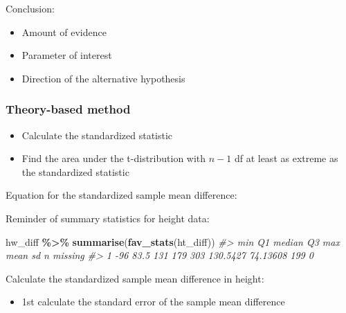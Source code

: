 \documentclass[
]{report}
\newenvironment{Shaded}{\begin{snugshade}}{\end{snugshade}}
\newcommand{\CommentTok}[1]{\textcolor[rgb]{0.56,0.35,0.01}{\textit{#1}}}
\newcommand{\FunctionTok}[1]{\textcolor[rgb]{0.13,0.29,0.53}{\textbf{#1}}}
\newcommand{\NormalTok}[1]{#1}
\newcommand{\SpecialCharTok}[1]{\textcolor[rgb]{0.81,0.36,0.00}{\textbf{#1}}}
\providecommand{\tightlist}{%
  \setlength{\itemsep}{0pt}\setlength{\parskip}{0pt}}
\begin{document}
\vspace{0.8in}

Conclusion:

\begin{itemize}
\item
  Amount of evidence
\item
  Parameter of interest
\item
  Direction of the alternative hypothesis
\end{itemize}

\vspace{0.8in}

\hypertarget{theory-based-method-2}{%
\subsubsection*{Theory-based method}\label{theory-based-method-2}}

\begin{itemize}
\item
  Calculate the standardized statistic
\item
  Find the area under the t-distribution with \(n - 1\) df at least as extreme as the standardized statistic
\end{itemize}

Equation for the standardized sample mean difference:

\vspace{0.5in}

\newpage

Reminder of summary statistics for height data:

\begin{Shaded}
\begin{Highlighting}[]
\NormalTok{hw\_diff }\SpecialCharTok{\%\textgreater{}\%}
    \FunctionTok{summarise}\NormalTok{(}\FunctionTok{fav\_stats}\NormalTok{(ht\_diff))}
\CommentTok{\#\textgreater{}   min   Q1 median  Q3 max     mean       sd   n missing}
\CommentTok{\#\textgreater{} 1 {-}96 83.5    131 179 303 130.5427 74.13608 199       0}
\end{Highlighting}
\end{Shaded}

Calculate the standardized sample mean difference in height:

\begin{itemize}
\tightlist
\item
  1st calculate the standard error of the sample mean difference
\end{itemize}
\end{document}
